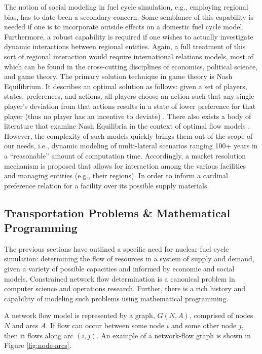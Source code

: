 The notion of social modeling in fuel cycle simulation, e.g., employing regional
bias, has to date been a secondary concern. Some semblance of this capability is
needed if one is to incorporate outside effects on a domestic fuel cycle
model. Furthermore, a robust capability is required if one wishes to actually
investigate dynamic interactions between regional entities. Again, a full
treatment of this sort of regional interaction would require international
relations models, most of which can be found in the cross-cutting disciplines of
economics, political science, and game theory. The primary solution technique in
game theory is Nash Equilibrium. It describes an optimal solution as follows:
given a set of players, states, preferences, and actions, all players choose an
action such that any single player's deviation from that actions results in a
state of lower preference for that player (thus no player has an incentive to
deviate) \cite{mccarty_political_2007}. There also exists a body of literature
that examine Nash Equilibria in the context of optimal flow models
\cite{mazumdar_fairness_1991,nagurney_supply_2002,song_nash_2002}. However, the
complexity of such models quickly brings them out of the scope of our needs,
i.e., dynamic modeling of multi-lateral scenarios ranging 100+ years in a
``reasonable'' amount of computation time. Accordingly, a market resolution
mechanism is proposed that allows for interaction among the various facilities
and managing entities (e.g., their regions). In order to inform a cardinal
preference \cite{strotz_cardinal_1953} relation for a facility over its possible
supply materials.

\subsection{Transportation Problems \& Mathematical Programming}\label{intro:prog}

The previous sections have outlined a specific need for nuclear fuel cycle
simulation: determining the flow of resources in a system of supply and demand,
given a variety of possible capacities and informed by economic and social
models. Constrained network flow determination is a canonical problem in
computer science and operations research. Further, there is a rich history and
capability of modeling such problems using mathematical programming.

A network flow model is represented by a graph, $G(N, A)$, comprised of nodes
$N$ and arcs $A$. If flow can occur between some node $i$ and some other node
$j$, then it flows along arc $(i, j)$. An example of a network-flow graph is
shown in Figure \ref{fig:node-arcs}.

